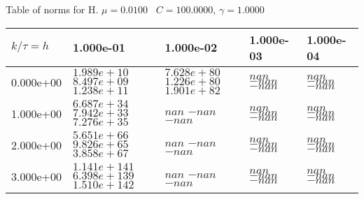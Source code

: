 \begin{center}
Table of norms for H. $\mu = 0.0100$ \, $C = 100.0000$, $\gamma = 1.0000$
  
\begin{tabular}{|p{1in}|p{1in}|p{1in}|p{1in}|p{1in}|} \hline
$k / \tau = h$ &1.000e-01 &1.000e-02 &1.000e-03 &1.000e-04 \\ \hline 
0.000e+00 & $1.989e+10$  $8.497e+09$  $1.238e+11$  & $7.628e+80$  $1.226e+80$  $1.901e+82$  & $nan$  $-nan$  $-nan$  & $nan$  $-nan$  $-nan$  \\ \hline 
1.000e+00 & $6.687e+34$  $7.942e+33$  $7.276e+35$  & $nan$  $-nan$  $-nan$  & $nan$  $-nan$  $-nan$  & $nan$  $-nan$  $-nan$  \\ \hline 
2.000e+00 & $5.651e+66$  $9.826e+65$  $3.858e+67$  & $nan$  $-nan$  $-nan$  & $nan$  $-nan$  $-nan$  & $nan$  $-nan$  $-nan$  \\ \hline 
3.000e+00 & $1.141e+141$  $6.398e+139$  $1.510e+142$  & $nan$  $-nan$  $-nan$  & $nan$  $-nan$  $-nan$  & $nan$  $-nan$  $-nan$  \\ \hline 

\end{tabular}\\[20pt]
\end{center}
